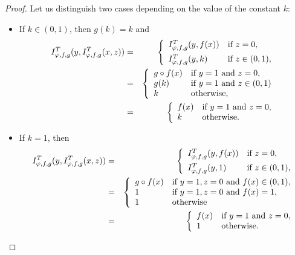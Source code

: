 \begin{proof}
	Let us distinguish two cases depending on the value of the constant $k$:
	\begin{itemize}
		\item If $k\in (0,1)$, then $g(k)=k$ and
		\begin{eqnarray*}
			I^T_{\varphi,f,g}(y,I^T_{\varphi,f,g}(x,z)) &=& 
			\left\{ \begin{array}{ll}
				I^T_{\varphi,f,g}(y,f(x)) &   \text{if }   z=0, \\[5pt]
				I^T_{\varphi,f,g}(y,k) & \text{if } z \in (0,1),
			\end{array}
			\right. \\
			&=&
			\left\{ \begin{array}{ll}
				g \circ f(x) &   \text{if }   y=1 \text{ and } z=0, \\
				g(k) & \text{if } y=1 \text{ and } z \in (0,1)\\
				k & \text{otherwise,}
			\end{array}
			\right. \\
			&=&
			\left\{ \begin{array}{ll}
				f(x) &   \text{if }   y=1 \text{ and } z=0, \\
				k & \text{otherwise.}
			\end{array}
			\right.
		\end{eqnarray*}
		\item If $k=1$, then
		\begin{eqnarray*}
			I^T_{\varphi,f,g}(y,I^T_{\varphi,f,g}(x,z)) &=& 
			\left\{ \begin{array}{ll}
				I^T_{\varphi,f,g}(y,f(x)) &   \text{if }   z=0, \\[5pt]
				I^T_{\varphi,f,g}(y,1) & \text{if } z \in (0,1),
			\end{array}
			\right. \\
			&=&
			\left\{ \begin{array}{ll}
				g \circ f(x) &   \text{if }   y=1, z=0 \text{ and } f(x) \in (0,1), \\
				1 & \text{if } y=1, z=0 \text{ and } f(x)=1,\\
				1 & \text{otherwise}
			\end{array}
			\right. \\
			&=&
			\left\{ \begin{array}{ll}
				f(x) &   \text{if }   y=1 \text{ and } z=0, \\
				1 & \text{otherwise.}
			\end{array}
			\right.
		\end{eqnarray*}	
	\end{itemize}
\end{proof}
